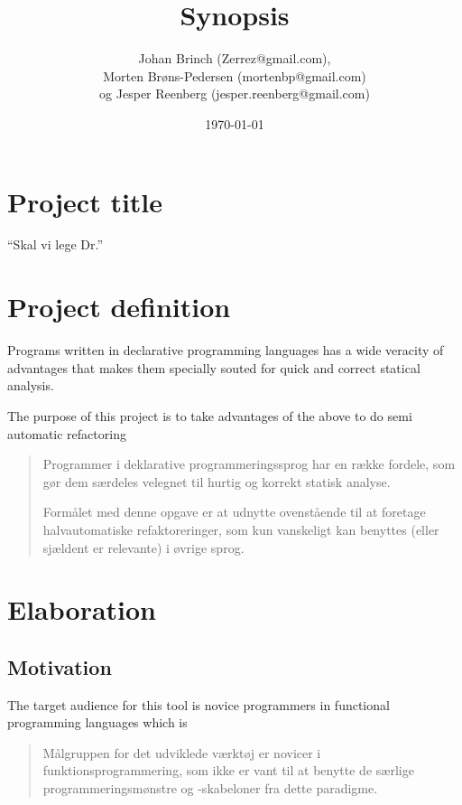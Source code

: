 \documentclass[a4paper,oneside]{memoir}
\title{Synopsis}
\author{Johan Brinch (Zerrez@gmail.com), \\
Morten Brøns-Pedersen (mortenbp@gmail.com) \\ og
Jesper Reenberg (jesper.reenberg@gmail.com)}
\date{\today}
\begin{document}
\maketitle

\section{Project title}

``Skal vi lege Dr.''

\section{Project definition}

Programs written in declarative programming languages has a wide veracity of
advantages that makes them specially souted  for quick and correct statical
analysis.

The purpose of this project is to take advantages of the above to do semi
automatic refactoring




\begin{quotation}
  Programmer i deklarative programmeringssprog har en række fordele, som gør dem
  særdeles velegnet til hurtig og korrekt statisk analyse.

  Formålet med denne opgave er at udnytte ovenstående til at foretage
  halvautomatiske refaktoreringer, som kun vanskeligt kan benyttes (eller
  sjældent er relevante) i øvrige sprog.
\end{quotation}

\section{Elaboration}

\subsection{Motivation}

The target audience for this tool is novice programmers in functional
programming languages which is 

\begin{quotation}
  Målgruppen for det udviklede værktøj er novicer i funktionsprogrammering, som
  ikke er vant til at benytte de særlige programmeringsmønstre og -skabeloner
  fra dette paradigme.
\end{quotation}
\end{document}
